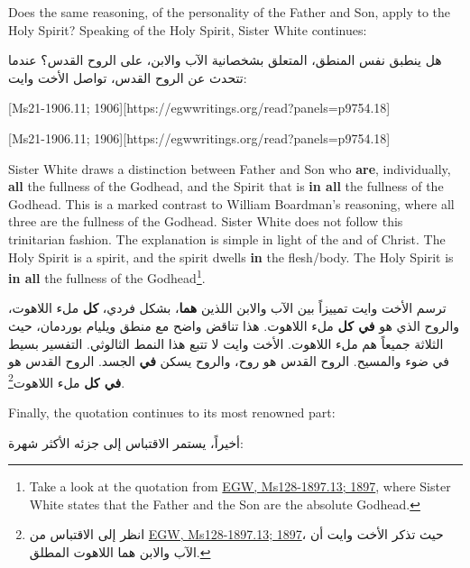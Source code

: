Does the same reasoning, of the personality of the Father and Son, apply to the Holy Spirit? Speaking of the Holy Spirit, Sister White continues:


هل ينطبق نفس المنطق، المتعلق بشخصانية الآب والابن، على الروح القدس؟ عندما تتحدث عن الروح القدس، تواصل الأخت وايت:


[Ms21-1906.11; 1906][https://egwwritings.org/read?panels=p9754.18]


[Ms21-1906.11; 1906][https://egwwritings.org/read?panels=p9754.18]


Sister White draws a distinction between Father and Son who \textbf{are}, individually, \textbf{all} the fullness of the Godhead, and the Spirit that is \textbf{in all} the fullness of the Godhead. This is a marked contrast to William Boardman’s reasoning, where all three are the fullness of the Godhead. Sister White does not follow this trinitarian fashion. The explanation is simple in light of the  and of Christ. The Holy Spirit is a spirit, and the spirit dwells \textbf{in} the flesh/body. The Holy Spirit is \textbf{in all} the fullness of the Godhead\footnote{Take a look at the quotation from \href{https://egwwritings.org/?ref=en_Ms128-1897.13&para=5426.19}{{EGW, Ms128-1897.13; 1897}}, where Sister White states that the Father and the Son are the absolute Godhead.}.


ترسم الأخت وايت تمييزاً بين الآب والابن اللذين \textbf{هما}، بشكل فردي، \textbf{كل} ملء اللاهوت، والروح الذي هو \textbf{في كل} ملء اللاهوت. هذا تناقض واضح مع منطق ويليام بوردمان، حيث الثلاثة جميعاً هم ملء اللاهوت. الأخت وايت لا تتبع هذا النمط الثالوثي. التفسير بسيط في ضوء  والمسيح. الروح القدس هو روح، والروح يسكن \textbf{في} الجسد. الروح القدس هو \textbf{في كل} ملء اللاهوت\footnote{انظر إلى الاقتباس من \href{https://egwwritings.org/?ref=en_Ms128-1897.13&para=5426.19}{{EGW, Ms128-1897.13; 1897}}، حيث تذكر الأخت وايت أن الآب والابن هما اللاهوت المطلق.}.


Finally, the quotation continues to its most renowned part:


أخيراً، يستمر الاقتباس إلى جزئه الأكثر شهرة:


